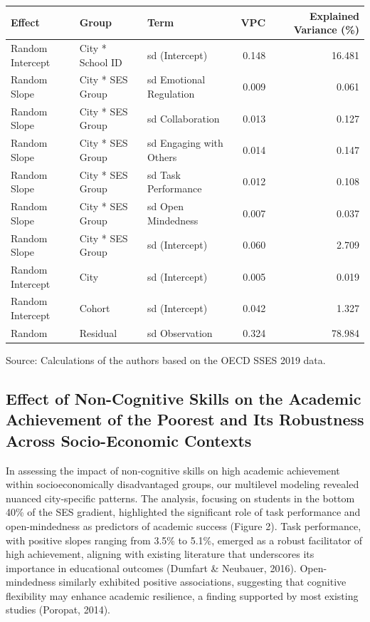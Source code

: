 \documentclass{article}
\begin{document}
\setlength{\LTpost}{0mm}
\begin{longtable}{lllrr}
\toprule
Effect & Group & Term & VPC & Explained Variance (\%) \\ 
\midrule\addlinespace[2.5pt]
Random Intercept & City * School ID & sd (Intercept) & 0.148 & 16.481 \\ 
Random Slope & City * SES Group & sd Emotional Regulation & 0.009 & 0.061 \\ 
Random Slope & City * SES Group & sd Collaboration & 0.013 & 0.127 \\ 
Random Slope & City * SES Group & sd Engaging with Others & 0.014 & 0.147 \\ 
Random Slope & City * SES Group & sd Task Performance & 0.012 & 0.108 \\ 
Random Slope & City * SES Group & sd Open Mindedness & 0.007 & 0.037 \\ 
Random Slope & City * SES Group & sd (Intercept) & 0.060 & 2.709 \\ 
Random Intercept & City & sd (Intercept) & 0.005 & 0.019 \\ 
Random Intercept & Cohort & sd (Intercept) & 0.042 & 1.327 \\ 
Random & Residual & sd Observation & 0.324 & 78.984 \\ 
\bottomrule
\end{longtable}
\begin{minipage}{\linewidth}
Source: Calculations of the authors based on the OECD SSES 2019 data.\\
\end{minipage}

\hypertarget{effect-of-non-cognitive-skills-on-the-academic-achievement-of-the-poorest-and-its-robustness-across-socio-economic-contexts}{%
\subsection{Effect of Non-Cognitive Skills on the Academic Achievement
of the Poorest and Its Robustness Across Socio-Economic
Contexts}\label{effect-of-non-cognitive-skills-on-the-academic-achievement-of-the-poorest-and-its-robustness-across-socio-economic-contexts}}

In assessing the impact of non-cognitive skills on high academic
achievement within socioeconomically disadvantaged groups, our
multilevel modeling revealed nuanced city-specific patterns. The
analysis, focusing on students in the bottom 40\% of the SES gradient,
highlighted the significant role of task performance and open-mindedness
as predictors of academic success (Figure 2). Task performance, with
positive slopes ranging from 3.5\% to 5.1\%, emerged as a robust
facilitator of high achievement, aligning with existing literature that
underscores its importance in educational outcomes (Dumfart \& Neubauer,
2016). Open-mindedness similarly exhibited positive associations,
suggesting that cognitive flexibility may enhance academic resilience, a
finding supported by most existing studies (Poropat, 2014).
\end{document}
